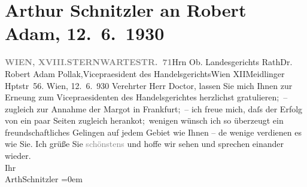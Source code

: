 

         
         \renewcommand{\erwaehntePersonen}{Personen: Robert Adam}
         \renewcommand{\erwaehnteInstitutionen}{Institutionen: Handelsgericht Wien}
         \renewcommand{\erwaehnteOrte}{Orte: Frankfurt am Main, Meidlinger Hauptstraße, Sternwartestraße, Wien, XII., Meidling, XVIII., Währing}
         \renewcommand{\erwaehnteWerke}{Werke: Margot und das Jugendgericht}
               \section[Arthur Schnitzler an Robert Adam, 12. 6. 1930]{ Arthur Schnitzler an Robert Adam, 12. 6. 1930}\nopagebreak{}\rehead{ }\begin{ledgroupsized}[t]{13cm}\normalsize\beginnumbering \toendnotes[C]{\smallbreak\pagebreak[2]} 
\toendnotes[C]{\smallbreak}\pstart{}{\pb}\label{T_L02536-1v}\label{T_L02536-1h}\pend{}\pstart{}\textcolor{gray}{\textbf{WIEN, XVIII.}}\pend{}\pstart{}\textcolor{gray}{\textbf{STERNWARTESTR. 71}}\pend{}{\bigskip}\pstart{}{\pb}Hrn Ob. Landesgerichts Rath\pend{}\pstart{}Dr. Robert Adam Pollak,\pend{}\pstart{}Vicepraesident des Handelsgerichts\pend{}\pstart{}Wien XII\pend{}\pstart{}Meidlinger Hptstr 56.\pend{}{\bigskip}\pstart
           \raggedleft{}{\pb}Wien, 12. 6. 930\pend
           \pstart{}Verehrter Herr Doctor,\pend\pstart
           lassen Sie mich Ihnen zur Erne{\geminationn}ung zum Vicepraesidenten
               des Handelsgerichtes herzlichst gratulieren; –
               zugleich zur Annahme der Margot in Frankfurt; – ich freue mich, daſs der Erfolg von
               ein paar Seiten zugleich heranko{\geminationm}t; wenigen wünsch ich
               so überzeugt ein freundschaftliches Gelingen auf jedem Gebiet wie Ihnen – de{\geminationn} wenige verdienen es wie Sie.\pend
           \pstart
           Ich grüße Sie \textcolor{gray}{schönstens} und hoffe wir sehen und sprechen
               einander wieder.{\\[\baselineskip]}Ihr{\\[\baselineskip]}\spacefill\mbox{ArthSchnitzler}\pend
           \leftskip=0em{}
         

\end{ledgroupsized}
